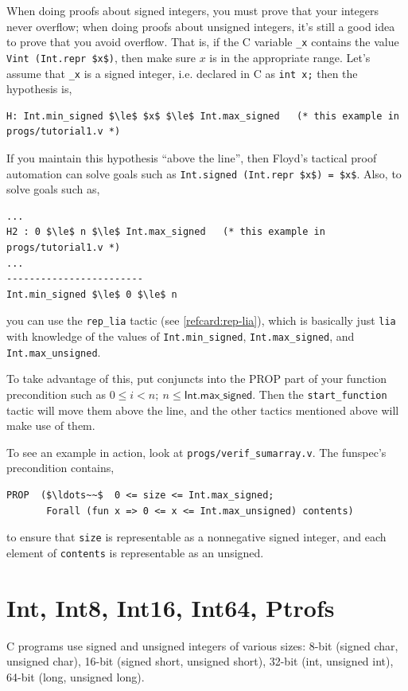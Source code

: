 \documentclass[12pt,fleqn,openany,oneside,showtrims]{memoir}
\begin{document}
When doing proofs about signed integers,
you must prove that your integers never overflow;
when doing proofs about unsigned integers,
it's still a good idea to prove that you avoid
overflow.  That is,
if the C variable \lstinline{_x} contains the value
\lstinline{Vint (Int.repr $x$)}, then make sure $x$ is in
the appropriate range.  Let's assume that \lstinline{_x}
is a signed integer, i.e. declared in C as \lstinline{int x;}
then the hypothesis is,
\begin{lstlisting}
H: Int.min_signed $\le$ $x$ $\le$ Int.max_signed   (* this example in progs/tutorial1.v *)
\end{lstlisting}
If you maintain this hypothesis ``above the line'',
then Floyd's tactical proof automation
can solve goals such as
\lstinline{Int.signed (Int.repr $x$) = $x$}.
Also, to solve goals such as,
\begin{lstlisting}
...
H2 : 0 $\le$ n $\le$ Int.max_signed   (* this example in progs/tutorial1.v *)
...
------------------------
Int.min_signed $\le$ 0 $\le$ n
\end{lstlisting}
you can use the \lstinline{rep_lia} tactic (see \autoref{refcard:rep-lia}),
which is basically just \lstinline{lia} with
knowledge of the values of
\lstinline{Int.min_signed},
\lstinline{Int.max_signed},
and \lstinline{Int.max_unsigned}.

To take advantage of this, put
conjuncts into the PROP part of your function precondition
such as $0\le i < n; ~n \le \mathsf{Int.max\_signed}$.
Then the \lstinline{start_function} tactic will move them
above the line, and the other tactics mentioned
above will make use of them.

To see an example in action, look
at \lstinline{progs/verif_sumarray.v}.
The funspec's precondition contains,
\begin{lstlisting}
PROP  ($\ldots~~$  0 <= size <= Int.max_signed;
       Forall (fun x => 0 <= x <= Int.max_unsigned) contents)
\end{lstlisting}
\vspace{-\baselineskip}
to ensure that \lstinline{size} is representable
as a nonnegative signed integer,
and each element of \lstinline{contents}
is representable as an unsigned.

\chapter{Int, Int8, Int16, Int64, Ptrofs}

C programs use signed and unsigned integers of various sizes:
8-bit (signed char, unsigned char), 16-bit (signed short, unsigned short),
32-bit (int, unsigned int), 64-bit (long, unsigned long).
\end{document}
